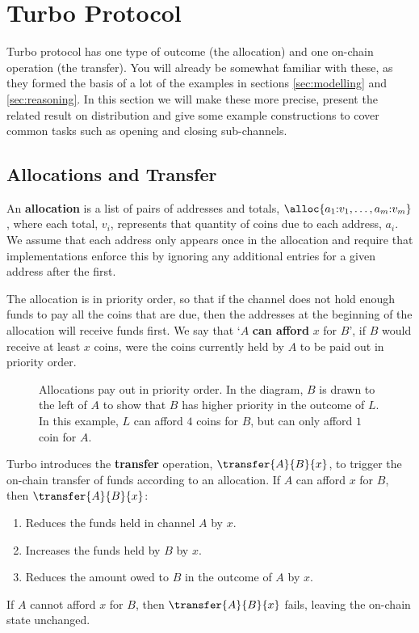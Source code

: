 \section{Turbo Protocol}

Turbo protocol has one type of outcome (the allocation) and one on-chain operation (the transfer).
You will already be somewhat familiar with these, as they formed the basis of a lot of the examples in sections \ref{sec:modelling} and \ref{sec:reasoning}.
In this section we will make these more precise, present the related result on distribution and give some example constructions to cover common tasks such as opening and closing sub-channels.

\subsection{Allocations and Transfer}

An \textbf{allocation} is a list of pairs of addresses and totals, $\alloc{a_1{:}v_1, \dots, a_m{:}v_m}$, where each total, $v_i$, represents that quantity of coins due to each address, $a_i$.
We assume that each address only appears once in the allocation and require that implementations enforce this by ignoring any additional entries for a given address after the first.

The allocation is in priority order, so that if the channel does not hold enough funds to pay all the coins that are due, then the addresses at the beginning of the allocation will receive funds first.
We say that `$A$ \textbf{can afford} $x$ for $B$', if $B$ would receive at least $x$ coins, were the coins currently held by $A$ to be paid out in priority order.

\begin{figure}[h]\centering
  \makebox[\textwidth][c]{}
  \caption{
    Allocations pay out in priority order.
    In the diagram, $B$ is drawn to the left of $A$ to show that $B$ has higher priority in the outcome of $L$.
    In this example, $L$ can afford $4$ coins for $B$, but can only afford $1$ coin for $A$.
  }\label{fig:transfer-insufficient-funds}
\end{figure}

Turbo introduces the \textbf{transfer} operation, $\transfer{A}{B}{x}$, to trigger the on-chain transfer of funds according to an allocation.
If $A$ can afford $x$ for $B$, then $\transfer{A}{B}{x}$:
\begin{enumerate}
  \item Reduces the funds held in channel $A$ by $x$. 
  \item Increases the funds held by $B$ by $x$.
  \item Reduces the amount owed to $B$ in the outcome of $A$ by $x$.
\end{enumerate}
If $A$ cannot afford $x$ for $B$, then $\transfer{A}{B}{x}$ fails, leaving the on-chain state unchanged.

